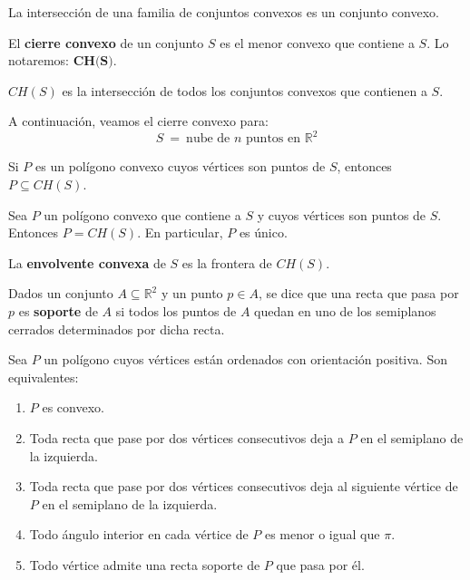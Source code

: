 \documentclass[twoside]{report}
\begin{document}
\begin{prop} La intersección de una familia de
conjuntos convexos es un conjunto convexo.
\end{prop}

\begin{defi} El \textbf{cierre convexo} de un conjunto $S$
es el menor convexo que contiene a $S$. Lo notaremos: $\textbf{CH(S)}$.
\end{defi}

\begin{prop} $CH(S)$ es la intersección de todos los
conjuntos convexos que contienen a $S$.
\end{prop}

\begin{nota} A continuación, veamos el cierre convexo para:
$$S \ = \ \mbox{nube de $n$ puntos en } \mathbb{R}^2$$
\end{nota}

\begin{prop} Si $P$ es un polígono convexo cuyos
vértices son puntos de $S$, entonces $P\subseteq CH(S)$.
\end{prop}

\begin{prop} Sea $P$ un polígono convexo que contiene
a $S$ y cuyos vértices son puntos de $S$. Entonces $P=CH(S)$. En
particular, $P$ es único.
\end{prop}

\begin{prop} La \textbf{envolvente convexa} de $S$ es la
frontera de $CH(S)$.
\end{prop}

\begin{defi} Dados un conjunto $A \subseteq \mathbb{R}^2$ y un
punto $p \in A$, se dice que una recta que pasa por $p$ es
\textbf{soporte} de $A$ si todos los puntos de $A$ quedan en uno de los
semiplanos cerrados determinados por dicha recta.
\end{defi}

\begin{teorema} Sea $P$ un polígono cuyos vértices están
ordenados con orientación positiva. Son equivalentes:
\begin{enumerate}
  \item $P$ es convexo.
  \item Toda recta que pase por dos vértices consecutivos deja a $P$
en el semiplano de la izquierda.
  \item Toda recta que pase por dos vértices consecutivos deja al
siguiente vértice de $P$ en el semiplano de la izquierda.
  \item Todo ángulo interior en cada vértice de $P$ es menor o igual
que $\pi$.
  \item Todo vértice admite una recta soporte de $P$ que pasa por
él.
\end{enumerate}
\end{teorema}
\end{document}
